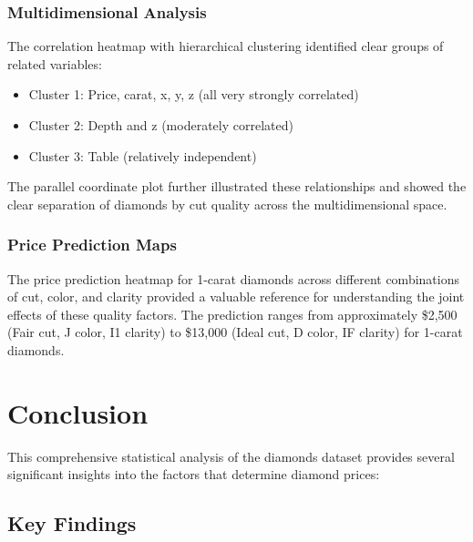 \documentclass[11pt,a4paper]{article}
\begin{document}
\subsubsection{Multidimensional Analysis}

The correlation heatmap with hierarchical clustering identified clear groups of related variables:

\begin{itemize}
    \item Cluster 1: Price, carat, x, y, z (all very strongly correlated)
    \item Cluster 2: Depth and z (moderately correlated)
    \item Cluster 3: Table (relatively independent)
\end{itemize}

The parallel coordinate plot further illustrated these relationships and showed the clear separation of diamonds by cut quality across the multidimensional space.

\subsubsection{Price Prediction Maps}

The price prediction heatmap for 1-carat diamonds across different combinations of cut, color, and clarity provided a valuable reference for understanding the joint effects of these quality factors. The prediction ranges from approximately \$2,500 (Fair cut, J color, I1 clarity) to \$13,000 (Ideal cut, D color, IF clarity) for 1-carat diamonds.

\section{Conclusion}

This comprehensive statistical analysis of the diamonds dataset provides several significant insights into the factors that determine diamond prices:

\subsection{Key Findings}
\end{document}
